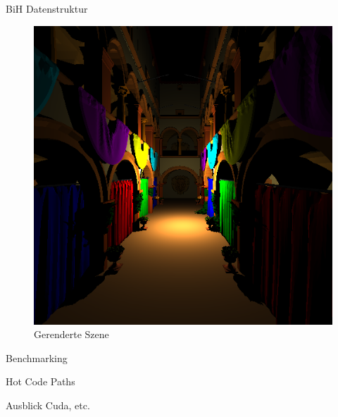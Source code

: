 \begin{frame}{BiH Datenstruktur}
\begin{figure}[ht]
\begin{minipage}[b]{0.45\linewidth}
            \includegraphics[width=\textwidth]{images/sponza.png}
            \caption{Gerenderte Szene}
            \label{fig:b}
        \end{minipage}
    \end{figure}
	\end{frame}
	\begin{frame}{Benchmarking}
	\end{frame}
	\begin{frame}{Hot Code Paths}
	\end{frame}
	\begin{frame}{Ausblick}
		Cuda, etc.
	\end{frame}


